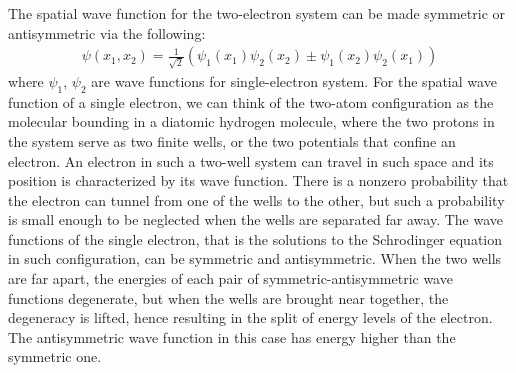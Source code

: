 \documentclass[11pt]{article}
\theoremstyle{break}
\theoremstyle{break}
\begin{document}
The spatial wave function for the two-electron system can be made symmetric or antisymmetric via the following:
\begin{align*}
\psi(x_1,x_2) = \frac{1}{\sqrt{2}}\left( \psi_1(x_1) \psi_2(x_2) \pm \psi_1(x_2) \psi_2(x_1)\right)
\end{align*}
where $\psi_1$, $\psi_2$ are wave functions for single-electron system. For the spatial wave function of a single electron, we can think of the two-atom configuration as the molecular bounding in a diatomic hydrogen
molecule, where the two protons in the system serve as two finite wells, or the two potentials that confine an electron. An electron in such a two-well system can travel in such space and its position is characterized by its wave function. There is a nonzero probability that the electron
can tunnel from one of the wells to the other, but such a probability is small enough to be neglected when the wells are separated far away. The wave functions of the single electron, that is the solutions to the Schrodinger equation in such configuration, can be symmetric and antisymmetric. When the two wells are far apart, the energies of each pair of symmetric-antisymmetric wave functions degenerate, but when the wells are brought near together, the degeneracy is lifted, hence resulting in the split of energy levels of the electron. The antisymmetric wave function in this case has energy higher than the symmetric one.\\
\end{document}
